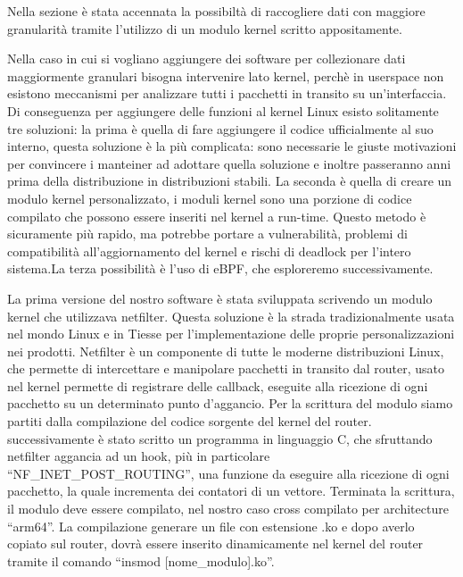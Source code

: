Nella sezione \cite{chapter:our_work} è stata accennata la possibiltà di raccogliere dati con maggiore granularità tramite l'utilizzo di un modulo kernel scritto appositamente.

Nella caso in cui si vogliano aggiungere dei software per collezionare dati maggiormente granulari bisogna intervenire lato kernel, perchè in userspace non esistono meccanismi per analizzare tutti i pacchetti in transito su un'interfaccia. Di conseguenza per aggiungere delle funzioni al kernel Linux esisto solitamente tre soluzioni: la prima è quella di fare aggiungere il codice ufficialmente al suo interno, questa soluzione è la più complicata: sono necessarie le giuste motivazioni per convincere i manteiner ad adottare quella soluzione e inoltre passeranno anni prima della distribuzione in distribuzioni stabili. La seconda è quella di creare un modulo kernel personalizzato, i moduli kernel sono una porzione di codice compilato che possono essere inseriti nel kernel a run-time. Questo metodo è sicuramente più rapido, ma potrebbe portare a vulnerabilità, problemi di compatibilità all'aggiornamento del kernel e rischi di deadlock per l'intero sistema.La terza possibilità è l'uso di eBPF, che esploreremo successivamente.

La prima versione del nostro software è stata sviluppata scrivendo un modulo kernel che utilizzava netfilter. Questa soluzione è la strada tradizionalmente usata nel mondo Linux e in Tiesse per l'implementazione delle proprie personalizzazioni nei prodotti.
Netfilter è un componente di tutte le moderne distribuzioni Linux, che permette di intercettare e manipolare pacchetti in transito dal router, usato nel kernel permette di registrare delle callback, eseguite alla ricezione di ogni pacchetto su un determinato punto d'aggancio.
Per la scrittura del modulo siamo partiti dalla compilazione del codice sorgente del kernel del router. successivamente è stato scritto un programma in linguaggio C, che sfruttando netfilter aggancia ad un hook, più in particolare ``NF\_INET\_POST\_ROUTING'', una funzione da eseguire alla ricezione di ogni pacchetto, la quale incrementa dei contatori di un vettore.
Terminata la scrittura, il modulo deve essere compilato, nel nostro caso cross compilato per architecture ``arm64''. La compilazione generare un file con estensione .ko e dopo averlo copiato sul router, dovrà essere inserito dinamicamente nel kernel del router tramite il comando ``insmod [nome\_modulo].ko''.

